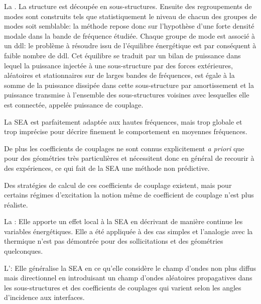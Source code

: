 \bigskip
La .
La structure est découpée en sous-structures.
Ensuite des regroupements de modes sont construits tels que statistiquement le niveau
de chacun des groupes de modes soit semblable: la méthode repose donc sur l'hypothèse
d'une forte densité modale dans la bande de fréquence étudiée.
Chaque groupe de mode est associé à un ddl: le problème à résoudre issu
de l'équilibre énergétique est par conséquent à faible nombre de ddl.
Cet équilibre se traduit par un bilan de puissance dans lequel la puissance injectée
à une sous-structure par des forces extérieures, aléatoires et stationnaires sur de
larges bandes de fréquences, est égale à la somme de la puissance dissipée
dans cette sous-structure par amortissement et la puissance transmise à l'ensemble
des sous-structures voisines avec lesquelles elle est connectée, appelée puissance
de couplage.

La SEA est parfaitement adaptée aux hautes fréquences, mais trop globale et trop imprécise pour
décrire finement le comportement en moyennes fréquences.

De plus les coefficients de couplages ne sont connus explicitement \emph{a priori} que pour
des géométries très particulières et nécessitent donc en général de recourir
à des expériences, ce qui fait de la SEA une méthode non prédictive.

Des stratégies de calcul de ces coefficients de couplage existent, mais pour certains
régimes d'excitation la notion même de coefficient de couplage n'est plus réaliste.

\bigskip
La :
Elle apporte un effet local à la SEA en décrivant de manière continue les variables
énergétiques. Elle a été appliquée à des cas simples et l'analogie avec la thermique
n'est pas démontrée pour des sollicitations et des géométries quelconques.

\bigskip
L':
Elle généralise la SEA en ce qu'elle considère le champ d'ondes non plus diffus mais
directionnel en introduisant un champ d'ondes aléatoires propagatives dans les
sous-structures et des coefficients de couplages qui varient selon les angles
d'incidence aux interfaces.

